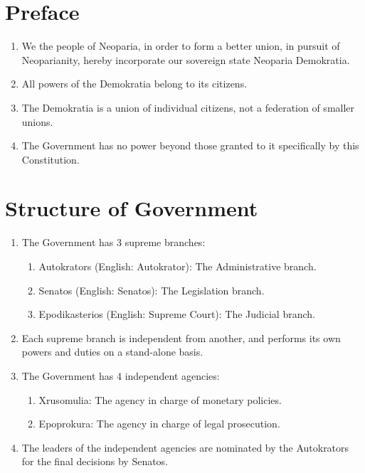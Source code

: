 



\section{Preface}
\begin{enumerate}
	\item We the people of Neoparia, in order to form a better union, in pursuit of Neoparianity, hereby incorporate our sovereign state Neoparia Demokratia.
	\item All powers of the Demokratia belong to its citizens.
	\item The Demokratia is a union of individual citizens, not a federation of smaller unions.
	\item The Government has no power beyond those granted to it specifically by this Constitution.
\end{enumerate}

\section{Structure of Government}
\begin{enumerate}[start=101]
	\item The Government has 3 supreme branches:
	      \begin{enumerate}
		      \item Autokrators (English: Autokrator): The Administrative branch.
		      \item Senatos (English: Senatos): The Legislation branch.
		      \item Epodikasterios (English: Supreme Court): The Judicial branch.
	      \end{enumerate}
	\item Each supreme branch is independent from another, and performs its own powers and duties on a stand-alone basis.
	\item The Government has 4 independent agencies:
	      \begin{enumerate}
		      \item Xrusomulia: The agency in charge of monetary policies.
		      \item Epoprokura: The agency in charge of legal prosecution.
	      \end{enumerate}
	\item The leaders of the independent agencies are nominated by the Autokrators for the final decisions by Senatos.
\end{enumerate}

